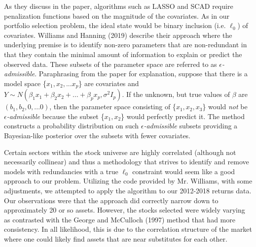 \documentclass[a4paper, 12pt]{article}
\theoremstyle{plain}
\theoremstyle{definition}
\theoremstyle{remark}
\begin{document}
As they discuss in the paper, algorithms such as LASSO and SCAD require penalization functions based on the magnitude of the covariates. As in our portfolio selection problem, the ideal state would be binary inclusion (i.e. $\ell_0$) of covariates. Williams and Hanning (2019) describe their approach where the underlying premise is to identify non-zero parameters that are non-redundant in that they contain the minimal amount of information to explain or predict the observed data. These subsets of the parameter space are referred to as \textit{$\epsilon$-admissible}. Paraphrasing from the paper for explanation, suppose that there is a model space \{$x_1, x_2, ... x_p$\} are covariates and $Y \sim N(\beta_1 x_1 + \beta_2 x_2 + ... +\beta_p x_p, \sigma^2 I_p)$. If the unknown, but true values of \textbf{$\beta$} are $(b_1,b_2,0,...0)$, then the parameter space consisting of \{$x_1, x_2, x_3$\} would \textit{not} be \textit{$\epsilon$-admissible} because the subset \{$x_1, x_2$\} would perfectly predict it. The method constructs a probability distribution on such \textit{$\epsilon$-admissible} subsets providing a Bayesian-like posterior over the subsets with fewer covariates.

Certain sectors within the stock universe are highly correlated (although not necessarily collinear) and thus a methodology that strives to identify and remove models with redundancies with a true $\ell_0$ constraint would seem like a good approach to our problem. Utilizing the code provided by Mr. Williams, with some adjustments, we attempted to apply the algorithm to our 2012-2018 returns data. Our observations were that the approach did correctly narrow down to approximately 20 or so assets. However, the stocks selected were widely varying as contrasted with the George and McCulloch (1997) method that had more consistency. In all likelihood, this is due to the correlation structure of the market where one could likely find assets that are near substitutes for each other.
\end{document}
